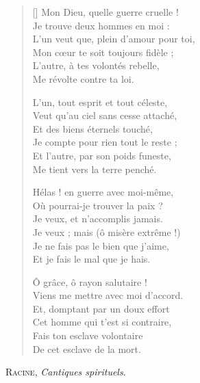 \documentclass[11pt,a6paper,french]{scrartcl}
\begin{document}
\settowidth{\versewidth}{Mon Dieu, quelle guerre cruelle !}

\medskip
\begin{verse}[\versewidth]
Mon Dieu, quelle guerre cruelle !\\
Je trouve deux hommes en moi :\\
L’un veut que, plein d’amour pour toi,\\
Mon cœur te soit toujours fidèle ;\\
L’autre, à tes volontés rebelle,\\
Me révolte contre ta loi.

L’un, tout esprit et tout céleste,\\
Veut qu’au ciel sans cesse attaché,\\
Et des biens éternels touché,\\
Je compte pour rien tout le reste ;\\
Et l’autre, par son poids funeste,\\
Me tient vers la terre penché.

\newpage
Hélas ! en guerre avec moi-même,\\
Où pourrai-je trouver la paix ?\\
Je veux, et n’accomplis jamais.\\
Je veux ; mais (ô misère extrême !)\\
Je ne fais pas le bien que j’aime,\\
Et je fais le mal que je hais.

Ô grâce, ô rayon salutaire !\\
Viens me mettre avec moi d’accord.\\
Et, domptant par un doux effort\\
Cet homme qui t’est si contraire,\\
Fais ton esclave volontaire\\
De cet esclave de la mort.
\end{verse}
\medskip
\begin{flushright}
\large
\textsc{Racine}, \textit{Cantiques spirituels}.
\end{flushright}
\end{document}
